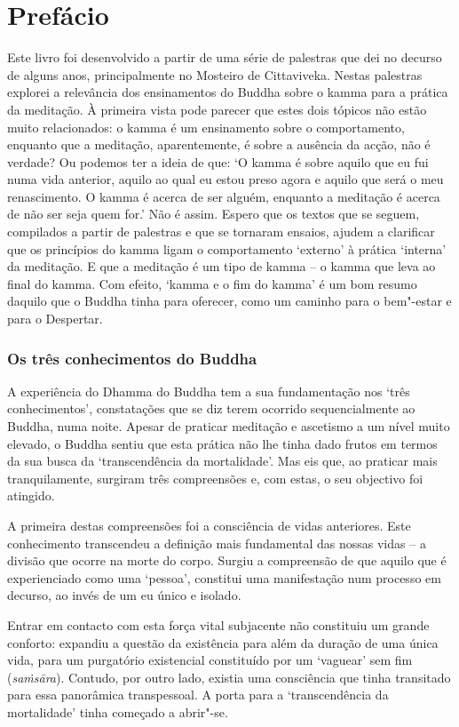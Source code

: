 \chapter{Prefácio}

Este livro foi desenvolvido a partir de uma série de palestras que dei no
decurso de alguns anos, principalmente no Mosteiro de Cittaviveka. Nestas
palestras explorei a relevância dos ensinamentos do Buddha sobre o kamma para a
prática da meditação. À primeira vista pode parecer que estes dois tópicos não
estão muito relacionados: o kamma é um ensinamento sobre o comportamento,
enquanto que a meditação, aparentemente, é sobre a ausência da acção, não é
verdade? Ou podemos ter a ideia de que: `O kamma é sobre aquilo que eu fui numa
vida anterior, aquilo ao qual eu estou preso agora e aquilo que será o meu
renascimento. O kamma é acerca de ser alguém, enquanto a meditação é acerca de
não ser seja quem for.' Não é assim. Espero que os textos que se seguem,
compilados a partir de palestras e que se tornaram ensaios, ajudem a clarificar
que os princípios do kamma ligam o comportamento `externo' à prática `interna'
da meditação. E que a meditação é um tipo de kamma -- o kamma que leva ao final
do kamma. Com efeito, `kamma e o fim do kamma' é um bom resumo daquilo que o
Buddha tinha para oferecer, como um caminho para o bem"-estar e para o Despertar.

\subsection{Os três conhecimentos do Buddha}

A experiência do Dhamma do Buddha tem a sua fundamentação nos `três
conhecimentos', constatações que se diz terem ocorrido sequencialmente ao
Buddha, numa noite. Apesar de praticar meditação e ascetismo a um nível muito
elevado, o Buddha sentiu que esta prática não lhe tinha dado frutos em termos da
sua busca da `transcendência da mortalidade'. Mas eis que, ao praticar mais
tranquilamente, surgiram três compreensões e, com estas, o seu objectivo foi
atingido.

A primeira destas compreensões foi a consciência de vidas anteriores. Este
conhecimento transcendeu a definição mais fundamental das nossas vidas -- a
divisão que ocorre na morte do corpo. Surgiu a compreensão de que aquilo que é
experienciado como uma `pessoa', constitui uma manifestação num processo em
decurso, ao invés de um eu único e isolado.

Entrar em contacto com esta força vital subjacente não constituiu um grande
conforto: expandiu a questão da existência para além da duração de uma única
vida, para um purgatório existencial constituído por um `vaguear' sem fim
(\emph{saṁsāra}). Contudo, por outro lado, existia uma consciência que tinha
transitado para essa panorâmica transpessoal. A porta para a `transcendência da
mortalidade' tinha começado a abrir"-se.

